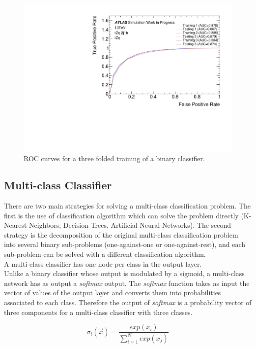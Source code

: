 \begin{figure}[h]
\centering
\includegraphics[scale=0.5]{Chapters/Chapter2/roccurve.pdf}
\caption{ROC curves for a three folded training of a binary classifier.}
\end{figure}

\subsection{Multi-class Classifier}
\label{section:multiclass_explanation}

There are two main strategies for solving a multi-class classification problem. 
The first is the use of classification algorithm which can solve the problem directly (K-Nearest Neighbors, Decision
Trees, Artificial Neural Networks). 
The second strategy is the decomposition of the original multi-class classification problem 
into several binary sub-problems (one-against-one or one-against-rest), and each sub-problem can be solved with a different 
classification algorithm.\\

A multi-class classifier has one node per class in the output layer.\\
Unlike a binary classifier whose output is modulated by a sigmoid, a multi-class network has as output a \textit{softmax} output. 
The \textit{softmax} function takes as input the vector of values of the output layer and converts them into probabilities associated to each class. 
Therefore the output of \textit{softmax} is a probability vector of three components for a multi-class classifier with three classes.

\begin{equation}
\sigma_i(\vec{x}) = \frac{exp(x_i)}{\sum^N_{i=1} exp(x_j)}
\end{equation}


